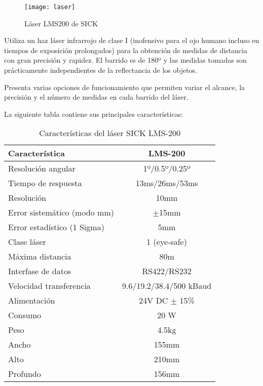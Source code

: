 \begin{figure}[h]
  \centering\texttt{[image: laser]}\\
  \caption{Láser LMS200 de SICK}\label{fg:laser}
\end{figure}

Utiliza un haz láser infrarrojo de clase I (inofensivo para el ojo humano incluso en tiempos de exposición prolongados) para la obtención de medidas de distancia con gran precisión y rapidez. El barrido es de 180º y las medidas tomadas son prácticamente independientes de la reflectancia de los objetos.

Presenta varias opciones de funcionamiento que permiten variar el alcance, la precisión y el número de medidas en cada barrido del láser.

La siguiente tabla contiene sus principales características:

\begin{table}[h]
\begin{center}
\begin{tabular}{|l|c|} \hline
Característica & LMS-200\\
\hline
\hline
Resolución angular & 1º/0.5º/0.25º\\
\hline
Tiempo de respuesta & 13ms/26ms/53ms\\
\hline
Resolución & 10mm\\
\hline
Error sistemático (modo mm) & $\pm$15mm\\
\hline
Error estadístico (1 Sigma) & 5mm\\
\hline
Clase láser & 1 (eye-safe)\\
\hline
\hline
Máxima distancia & 80m\\
\hline
Interfase de datos & RS422/RS232\\
\hline
Velocidad transferencia & 9.6/19.2/38.4/500 kBaud\\
\hline
Alimentación & 24V DC $\pm$ 15\%\\
\hline
\hline
Consumo & 20 W\\
\hline
Peso & 4.5kg\\
\hline
Ancho & 155mm\\
\hline
Alto & 210mm\\
\hline
Profundo & 156mm\\
\hline
\end{tabular}
\end{center}
\caption{Características del láser SICK LMS-200}
\end{table}



